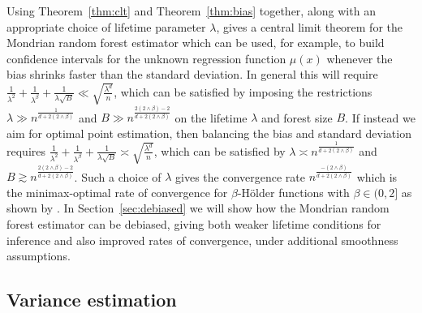 Using Theorem~\ref{thm:clt} and Theorem~\ref{thm:bias} together,
along with an appropriate choice of lifetime parameter $\lambda$,
gives a central limit theorem for the Mondrian random forest estimator
which can be used, for example, to build confidence intervals
for the unknown regression function $\mu(x)$
whenever the bias shrinks faster than the standard deviation.
In general this will require
$\frac{1}{\lambda^2} + \frac{1}{\lambda^\beta} + \frac{1}{\lambda \sqrt B}
\ll \sqrt{\frac{\lambda^d}{n}}$,
which can be satisfied by imposing the restrictions
$\lambda \gg n^{\frac{1}{d + 2(2 \wedge \beta)}}$
and $B \gg n^{\frac{2(2 \wedge \beta) - 2}{d + 2(2 \wedge \beta)}}$
on the lifetime $\lambda$ and forest size $B$.
If instead we aim for optimal point estimation,
then balancing the bias and standard deviation requires
$\frac{1}{\lambda^2} + \frac{1}{\lambda^\beta} + \frac{1}{\lambda \sqrt B}
\asymp \sqrt{\frac{\lambda^d}{n}}$,
which can be satisfied by
$\lambda \asymp n^{\frac{1}{d + 2(2 \wedge \beta)}}$
and $B \gtrsim n^{\frac{2(2 \wedge \beta) - 2}{d + 2(2 \wedge \beta)}}$.
Such a choice of $\lambda$ gives the convergence rate
$n^{\frac{-(2 \wedge \beta)}{d + 2(2 \wedge \beta)}}$
which is the minimax-optimal rate of convergence
\citep{stone1982optimal}
for $\beta$-H{\"o}lder functions with $\beta \in (0,2]$
as shown by \citet[Theorem~2]{mourtada2020minimax}.
In Section~\ref{sec:debiased} we will show how the Mondrian random forest
estimator can be debiased, giving both weaker lifetime conditions for inference
and also improved rates of convergence, under additional smoothness assumptions.

\subsection*{Variance estimation}

